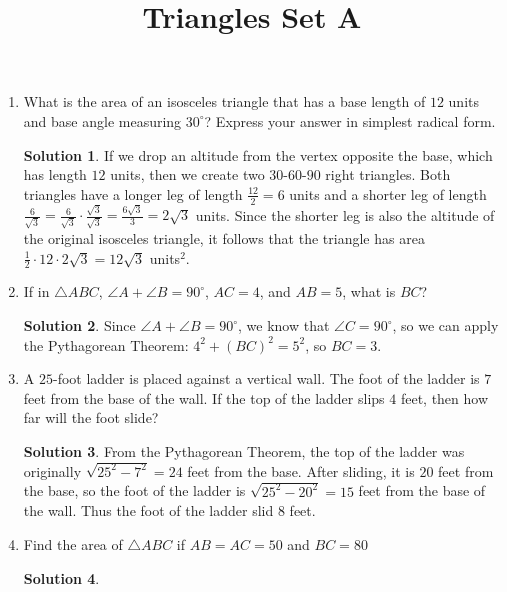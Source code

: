 \documentclass{article}
\title{Triangles Set A}
\date{}
\author{}
\theoremstyle{definition}
\newtheorem*{solution}{Solution}
\begin{document}
\maketitle

\begin{multicols}{2}
    \begin{enumerate}
        \item What is the area of an isosceles triangle that has a base length of $12$ units and base angle measuring $30^{\circ}$?
            Express your answer in simplest radical form.
            \begin{solution}
               If we drop an altitude from the vertex opposite the base, which has length $12$ units, then we create two $30$-$60$-$90$ right triangles.
               Both triangles have a longer leg of length $\frac{12}{2} = 6$ units and a shorter leg of length $\frac{6}{\sqrt{3}} = \frac{6}{\sqrt{3}} \cdot \frac{\sqrt{3}}{\sqrt{3}} = \frac{6\sqrt{3}}{3} = 2\sqrt{3}$ units.
               Since the shorter leg is also the altitude of the original isosceles triangle, it follows that the triangle has area $\frac{1}{2} \cdot 12 \cdot 2\sqrt{3} = 12\sqrt{3}$ units$^{2}$. 
            \end{solution}
        \item If in $\triangle ABC$, $\angle A + \angle B = 90^{\circ}$, $AC = 4$, and $AB = 5$, what is $BC$?
            \begin{solution}
                Since $\angle A + \angle B = 90^{\circ}$, we know that $\angle C = 90^{\circ}$, so we can apply the Pythagorean Theorem: $4^2 + (BC)^2 = 5^2$, so $BC = 3$.
            \end{solution}
        \item A $25$-foot ladder is placed against a vertical wall.
            The foot of the ladder is $7$ feet from the base of the wall.
            If the top of the ladder slips $4$ feet, then how far will the foot slide?
            \begin{solution}
                From the Pythagorean Theorem, the top of the ladder was originally $\sqrt{25^2 - 7^2} = 24$ feet from the base.
                After sliding, it is $20$ feet from the base, so the foot of the ladder is $\sqrt{25^2 - 20^2} = 15$ feet from the base of the wall.
                Thus the foot of the ladder slid $8$ feet.
            \end{solution}
        \item Find the area of $\triangle ABC$ if $AB = AC = 50$ and $BC = 80$
            \begin{solution}

\end{solution}
\end{enumerate}
\end{multicols}
\end{document}
